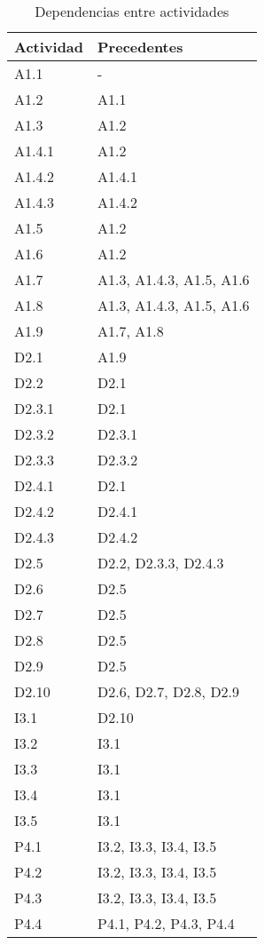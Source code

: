 \documentclass[11pt,a4paper,spanish,twoside]{report}
\begin{document}
\begin{table}[!h]
  \centering
  \begin{tabular}{|l||l|}
    \hline
    \textbf{Actividad} & \textbf{Precedentes}\\
    \hline \hline
    A1.1   & -                        \\
    A1.2   & A1.1                     \\
    A1.3   & A1.2                     \\
    A1.4.1 & A1.2                     \\
    A1.4.2 & A1.4.1                   \\
    A1.4.3 & A1.4.2                   \\
    A1.5   & A1.2                     \\
    A1.6   & A1.2                     \\
    A1.7   & A1.3, A1.4.3, A1.5, A1.6 \\
    A1.8   & A1.3, A1.4.3, A1.5, A1.6 \\
    A1.9   & A1.7, A1.8               \\
    \hline
    D2.1   & A1.9                     \\
    D2.2   & D2.1                     \\
    D2.3.1 & D2.1                     \\
    D2.3.2 & D2.3.1                   \\
    D2.3.3 & D2.3.2                   \\
    D2.4.1 & D2.1                     \\
    D2.4.2 & D2.4.1                   \\
    D2.4.3 & D2.4.2                   \\
    D2.5   & D2.2, D2.3.3, D2.4.3     \\
    D2.6   & D2.5                     \\
    D2.7   & D2.5                     \\
    D2.8   & D2.5                     \\
    D2.9   & D2.5                     \\
    D2.10  & D2.6, D2.7, D2.8, D2.9   \\
    \hline
    I3.1   & D2.10                    \\
    I3.2   & I3.1                     \\
    I3.3   & I3.1                     \\
    I3.4   & I3.1                     \\
    I3.5   & I3.1                     \\
    \hline
    P4.1   & I3.2, I3.3, I3.4, I3.5   \\
    P4.2   & I3.2, I3.3, I3.4, I3.5   \\
    P4.3   & I3.2, I3.3, I3.4, I3.5   \\
    P4.4   & P4.1, P4.2, P4.3, P4.4   \\
    \hline
    
  \end{tabular}
  \caption{Dependencias entre actividades} \label{Tab:tabdep}
\end{table}
\end{document}

